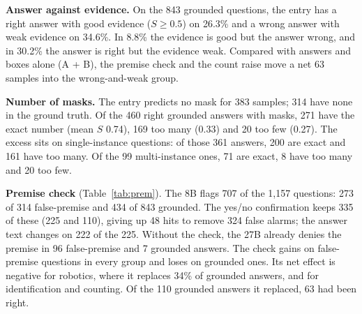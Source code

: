 \documentclass{article}
\begin{document}
\textbf{Answer against evidence.} On the 843 grounded questions, the entry has a right answer with good evidence ($S\geq0.5$) on
26.3\% and a wrong answer with weak evidence on 34.6\%. In 8.8\% the evidence is good but the answer wrong, and in 30.2\% the answer
is right but the evidence weak. Compared with answers and boxes alone (A + B), the premise check and the count raise move a net 63
samples into the wrong-and-weak group.

\textbf{Number of masks.} The entry predicts no mask for 383 samples; 314 have none in the ground truth. Of the 460 right grounded
answers with masks, 271 have the exact number (mean $S$ 0.74), 169 too many (0.33) and 20 too few (0.27). The excess sits on
single-instance questions: of those 361 answers, 200 are exact and 161 have too many. Of the 99 multi-instance ones, 71 are exact, 8
have too many and 20 too few.

\textbf{Premise check} (Table~\ref{tab:prem}). The 8B flags 707 of the 1,157 questions: 273 of 314 false-premise and 434 of 843
grounded. The yes/no confirmation keeps 335 of these (225 and 110), giving up 48 hits to remove 324 false alarms; the answer text
changes on 222 of the 225. Without the check, the 27B already denies the premise in 96 false-premise and 7 grounded answers. The check
gains on false-premise questions in every group and loses on grounded ones. Its net effect is negative for robotics, where it replaces
34\% of grounded answers, and for identification and counting. Of the 110 grounded answers it replaced, 63 had been right.
\end{document}
